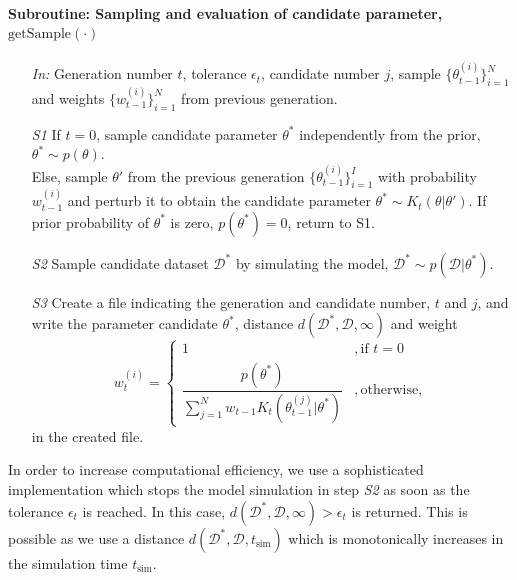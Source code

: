 \documentclass[10pt,letterpaper]{article}
\begin{document}
\paragraph{Subroutine: Sampling and evaluation of candidate parameter, $\boldsymbol{\mathrm{getSample}(\cdot)}$}
\begin{itemize}
%
\item[\it In:]
Generation number $t$, tolerance $\epsilon_t$, candidate number $j$, sample $\{\theta^{(i)}_{t-1}\}_{i=1}^N$ and weights $\{w^{(i)}_{t-1}\}_{i=1}^N$ from previous generation.
%
\item[\it S1] If $t=0$, sample candidate parameter $\theta^*$ independently from the prior, $\theta^* \sim p(\theta)$. \\
Else, sample $\theta'$ from the previous generation $\{\theta^{(i)}_{t-1}\}_{i=1}^I$ with probability $w^{(i)}_{t-1}$ and perturb it to obtain the candidate parameter $\theta^* \sim K_t(\theta|\theta')$. If prior probability of $\theta^*$ is zero, $p(\theta^*) = 0$, return to S1.
\item[\it S2] Sample candidate dataset $\mathcal{D}^*$ by simulating the model, $\mathcal{D}^* \sim p(\mathcal{D}|\theta^*)$.
\item[\it S3] Create a file indicating the generation and candidate number, $t$ and $j$, and write the parameter candidate $\theta^*$, distance $d(\mathcal{D}^*,\mathcal{D},\infty)$ and weight 
\begin{equation*}
w_t^{(i)} = \left\{\begin{array}{ll}
1 &, \text{if } t = 0 \\
\dfrac{p(\theta^*)}{\sum_{j=1}^{N} w_{t-1} K_t(\theta^{(j)}_{t-1}|\theta^*)} &, \text{otherwise},
\end{array}\right.
\end{equation*}
in the created file.
\end{itemize}
%
In order to increase computational efficiency, we use a sophisticated implementation which stops the model simulation in step \textit{S2} as soon as the tolerance $\epsilon_t$ is reached. In this case, $d(\mathcal{D}^*,\mathcal{D},\infty) > \epsilon_t$ is returned. This is possible as we use a distance $d(\mathcal{D}^*,\mathcal{D},t_{\text{sim}})$ which is monotonically increases in the simulation time $t_{\text{sim}}$.

%
\end{document}
